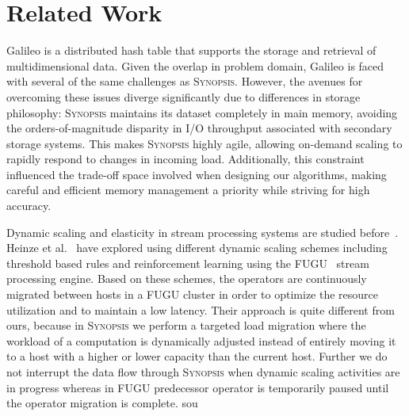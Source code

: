 \section{Related Work}
\label{sec:related}

Galileo \cite{} is a distributed hash table that supports the storage and retrieval of multidimensional data. Given the overlap in problem domain, Galileo is faced with several of the same challenges as \textsc{Synopsis}. However, the avenues for overcoming these issues diverge significantly due to differences in storage philosophy: \textsc{Synopsis} maintains its dataset completely in main memory, avoiding the orders-of-magnitude disparity in I/O throughput associated with secondary storage systems. This makes \textsc{Synopsis} highly agile, allowing on-demand scaling to rapidly respond to changes in incoming load. Additionally, this constraint influenced the trade-off space involved when designing our algorithms, making careful and efficient memory management a priority while striving for high accuracy.

Dynamic scaling and elasticity in stream processing systems are studied before~\cite{heinze2014auto, gulisano2012streamcloud, castro2013integrating, loesing2012stormy, heinze2013elastic}.
Heinze et al.~\cite{heinze2014auto} have explored using different dynamic scaling schemes including threshold based rules and reinforcement learning using the FUGU~\cite{heinze2013elastic} stream processing engine.
Based on these schemes, the operators are continuously migrated between hosts in a FUGU cluster in order to optimize the resource utilization and to maintain a low latency.
Their approach is quite different from ours, because in \textsc{Synopsis} we perform a targeted load migration where the workload of a computation is dynamically adjusted instead of entirely moving it to a host with a higher or lower capacity than the current host.
Further we do not interrupt the data flow through \textsc{Synopsis} when dynamic scaling activities are in progress whereas in FUGU predecessor operator is temporarily paused until the operator migration is complete. sou